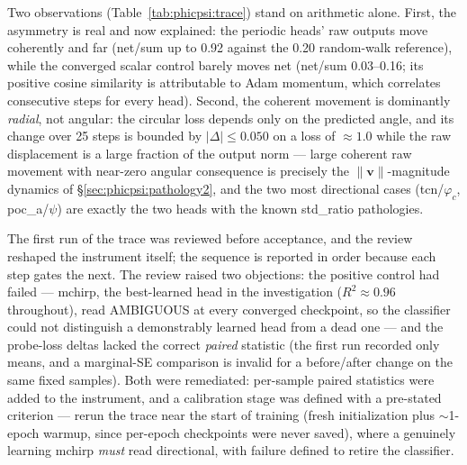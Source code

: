 Two observations (Table~\ref{tab:phicpsi:trace}) stand on arithmetic alone.
First, the asymmetry is real and now explained: the periodic heads' raw outputs move coherently and far (net/sum up to 0.92 against the 0.20 random-walk reference), while the converged scalar control barely moves net (net/sum 0.03--0.16; its positive cosine similarity is attributable to Adam momentum, which correlates consecutive steps for every head).
Second, the coherent movement is dominantly \emph{radial}, not angular: the circular loss depends only on the predicted angle, and its change over 25 steps is bounded by $|\Delta| \le 0.050$ on a loss of ${\approx}1.0$ while the raw displacement is a large fraction of the output norm --- large coherent raw movement with near-zero angular consequence is precisely the $\lVert\mathbf{v}\rVert$-magnitude dynamics of \S\ref{sec:phicpsi:pathology2}, and the two most directional cases (tcn/$\varphi_c$, poc\_a/$\psi$) are exactly the two heads with the known std\_ratio pathologies.

The first run of the trace was reviewed before acceptance, and the review reshaped the instrument itself; the sequence is reported in order because each step gates the next.
The review raised two objections: the positive control had failed --- mchirp, the best-learned head in the investigation ($R^2 \approx 0.96$ throughout), read AMBIGUOUS at every converged checkpoint, so the classifier could not distinguish a demonstrably learned head from a dead one --- and the probe-loss deltas lacked the correct \emph{paired} statistic (the first run recorded only means, and a marginal-SE comparison is invalid for a before/after change on the same fixed samples).
Both were remediated: per-sample paired statistics were added to the instrument, and a calibration stage was defined with a pre-stated criterion --- rerun the trace near the start of training (fresh initialization plus ${\sim}$1-epoch warmup, since per-epoch checkpoints were never saved), where a genuinely learning mchirp \emph{must} read directional, with failure defined to retire the classifier.

